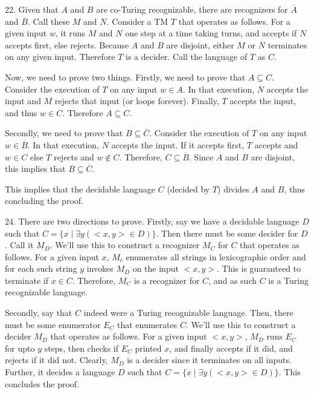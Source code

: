 \documentclass{article}
\begin{document}
22. Given that $A$ and $B$ are co-Turing recognizable, there are recognizers for $\overline{A}$ and $\overline{B}$. Call these $M$ and $N$. Consider a TM $T$ that operates as follows. For a given input $w$, it runs $M$ and $N$ one step at a time taking turns, and accepts if $N$ accepts first, else rejects. Because $A$ and $B$ are disjoint, either $M$ or $N$ terminates on any given input. Therefore $T$ is a decider. Call the language of $T$ as $C$.

Now, we need to prove two things. Firstly, we need to prove that $A \subseteq C$. Consider the execution of $T$ on any input $w \in A$. In that execution, $N$ accepts the input and $M$ rejects that input (or loops forever). Finally, $T$ accepts the input, and thus $w \in C$. Therefore $A \subseteq C$.

Secondly, we need to prove that $B \subseteq \overline{C}$. Consider the execution of $T$ on any input $w \in \overline{B}$. In that execution, $N$ accepts the input. If it accepts first, $T$ accepts and $w \in C$ else $T$ rejects and $w \notin C$. Therefore, $C \subseteq \overline{B}$. Since $A$ and $B$ are disjoint, this implies that $B \subseteq \overline{C}$.

This implies that the decidable language $C$ (decided by $T$) divides $A$ and $B$, thus concluding the proof.

24. There are two directions to prove. Firstly, say we have a decidable language $D$ such that $C = \{x \mid \exists{y} (<x, y> \in D)\}$. Then there must be some decider for $D$. Call it $M_D$. We'll use this to construct a recognizer $M_C$ for $C$ that operates as follows. For a given input $x$, $M_c$ enumerates all strings in lexicographic order and for each such string $y$ invokes $M_D$ on the input $<x, y>$. This is guaranteed to terminate if $x \in C$. Therefore, $M_C$ is a recognizer for $C$, and as such $C$ is a Turing recognizable language.

Secondly, say that $C$ indeed were a Turing recognizable language. Then, there must be some enumerator $E_C$ that enumerates $C$. We'll use this to construct a decider $M_D$ that operates as follows. For a given input $<x, y>$, $M_D$ runs $E_C$ for upto $y$ steps, then checks if $E_C$ printed $x$, and finally accepts if it did, and rejects if it did not. Clearly, $M_D$ is a decider since it terminates on all inputs. Further, it decides a language $D$ such that $C = \{x \mid \exists{y} (<x, y> \in D)\}$. This concludes the proof.
\end{document}
